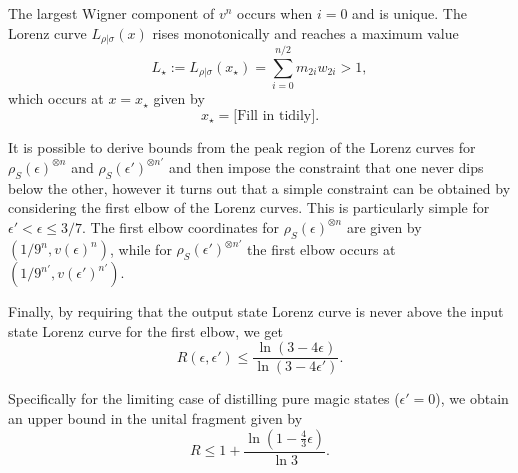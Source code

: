 \documentclass[pra,
aps,
twocolumn,
superscriptaddress,
groupedaddress,
nofootinbib,
reprint
]{revtex4-1}
\begin{document}
The largest Wigner component of $v^n$ occurs when $i=0$ and is unique. The Lorenz curve $L_{\rho|\sigma}(x)$ rises monotonically and reaches a maximum value
\begin{equation}
 L_\star:=L_{\rho |\sigma} (x_\star) = \sum_{i = 0}^{n/2} m_{2i} w_{2i} > 1,
\end{equation}
which occurs at $x=x_\star$ given by
\begin{equation}
x_\star = \mbox{[Fill in tidily]}.
\end{equation}

It is possible to derive bounds from the peak region of the Lorenz curves for $\rho_S(\epsilon)^{\otimes n}$ and $\rho_S(\epsilon')^{\otimes n'}$ and then impose the constraint that one never dips below the other, however it turns out that a simple constraint can be obtained by considering the first elbow of the Lorenz curves. This is particularly simple for $\epsilon' < \epsilon \leq 3/7$. \ddd{[Why??]}
The first elbow coordinates for $\rho_S(\epsilon)^{\otimes n}$ are given by $(1/9^n, v(\epsilon)^n)$, while for $\rho_S(\epsilon')^{\otimes n'}$ the first elbow occurs at $(1/9^{n'}, v(\epsilon')^{n'})$.

Finally, by requiring that the output state Lorenz curve is never above the input state Lorenz curve for the first elbow, we get
\begin{equation}
	R(\epsilon, \epsilon') \leq \frac{\ln{(3-4\epsilon)}}{\ln{(3-4\epsilon')}}.
\end{equation}

Specifically for the limiting case of distilling pure magic states ($\epsilon'=0$), we obtain an upper bound in the unital fragment given by
\begin{equation}
	R \leq 1 + \frac{\ln (1 - \frac{4}{3} \epsilon)}{\ln 3}.
\end{equation}
\end{document}
